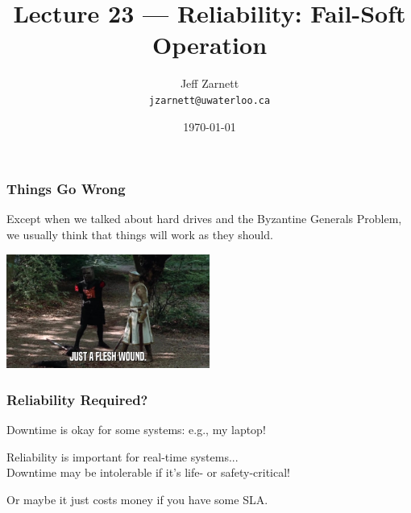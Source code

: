 

\title{Lecture 23 --- Reliability: Fail-Soft Operation }

\author{Jeff Zarnett \\ \small \texttt{jzarnett@uwaterloo.ca}}
\date{\today}




\begin{frame}
  \titlepage

 \end{frame}



\begin{frame}
\frametitle{Things Go Wrong}

Except when we talked about hard drives and the Byzantine Generals Problem, we usually think that things will work as they should.

\begin{center}
	\includegraphics[width=0.5\textwidth]{images/fleshwound.jpg}
\end{center}

\end{frame}

\begin{frame}
\frametitle{Reliability Required?}

Downtime is okay for some systems: e.g., my laptop!

Reliability is important for real-time systems...\\
\quad Downtime may be intolerable if it's life- or safety-critical!


Or maybe it just costs money if you have some SLA.

\end{frame}

